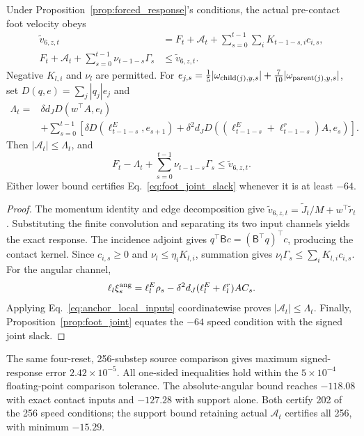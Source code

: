 \begin{proposition}
\label{prop:signed_response}
Under Proposition~\ref{prop:forced_response}'s conditions, the actual pre-contact foot velocity obeys
\begin{align}
 \widetilde v_{6,z,t}&=F_t+\mathcal A_t+
    \sum_{s=0}^{t-1}\sum_i K_{t-1-s,i}c_{i,s},\nonumber\\
 F_t+\mathcal A_t+\sum_{s=0}^{t-1}\nu_{t-1-s}\Gamma_s
    &\le\widetilde v_{6,z,t}.
 \label{eq:signed_foot_response}
\end{align}
Negative $K_{l,i}$ and $\nu_l$ are permitted.
For $e_{j,s}=\tfrac15|\omega_{{\rm child}(j),y,s}|+\tfrac7{10}|\omega_{{\rm parent}(j),y,s}|$, set $D(q,e)=\sum_j|q_j|e_j$ and
\begin{align}
 \Lambda_t={}&\delta d_JD(w^\top A,e_t)\nonumber\\
 &+\sum_{s=0}^{t-1}\left[
   \delta D(\ell_{t-1-s}^E,e_{s+1})+
   \delta^2d_JD((\ell_{t-1-s}^E+\ell_{t-1-s}^r)A,e_s)\right].
 \label{eq:signed_angular_cost}
\end{align}
Then $|\mathcal A_t|\le\Lambda_t$, and
\begin{equation}
 F_t-\Lambda_t+\sum_{s=0}^{t-1}\nu_{t-1-s}\Gamma_s\le\widetilde v_{6,z,t}.
 \label{eq:directional_foot_lower}
\end{equation}
Either lower bound certifies Eq.~\eqref{eq:foot_joint_slack} whenever it is at least $-64$.
\end{proposition}

\begin{proof}
The momentum identity and edge decomposition give $\widetilde v_{6,z,t}=\widetilde J_t/M+w^\top\widetilde r_t$.
Substituting the finite convolution and separating its two input channels yields the exact response.
The incidence adjoint gives $q^\top\mathsf Bc=(\mathsf B^\top q)^\top c$, producing the contact kernel.
Since $c_{i,s}\ge0$ and $\nu_l\le\eta_iK_{l,i}$, summation gives $\nu_l\Gamma_s\le\sum_iK_{l,i}c_{i,s}$.
For the angular channel,
\begin{equation}
 \ell_l\xi_s^{\rm ang}=\ell_l^E\rho_s-
   \delta^2d_J(\ell_l^E+\ell_l^r)AC_s.
\end{equation}
Applying Eq.~\eqref{eq:anchor_local_inputs} coordinatewise proves $|\mathcal A_t|\le\Lambda_t$.
Finally, Proposition~\ref{prop:foot_joint} equates the $-64$ speed condition with the signed joint slack.
\end{proof}

The same four-reset, 256-substep source comparison gives maximum signed-response error $2.42\times10^{-5}$.
All one-sided inequalities hold within the $5\times10^{-4}$ floating-point comparison tolerance.
The absolute-angular bound reaches $-118.08$ with exact contact inputs and $-127.28$ with support alone.
Both certify 202 of the 256 speed conditions; the support bound retaining actual $\mathcal A_t$ certifies all 256, with minimum $-15.29$.

